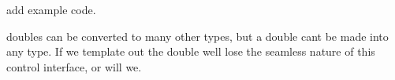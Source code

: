 
\begin{DoxyRefList}
\item[\label{todo__todo000002}%
\Hypertarget{todo__todo000002}%
Member \hyperlink{classCRTSController_aa2b26a62c62fe5758ab5cc9104e96b56}{C\+R\+T\+S\+Controller\+:\+:get\+Control} (const std\+::string name=\char`\"{}\char`\"{}, bool add\+Controller=true, bool start=false)]add example code. 
\item[\label{todo__todo000001}%
\Hypertarget{todo__todo000001}%
Member \hyperlink{classCRTSFilter_acc17d29240468c94e360e1b788f5d6a0}{C\+R\+T\+S\+Filter\+:\+:add\+Parameter} (std\+::string name, std\+::function$<$ double(void)$>$ get, std\+::function$<$ bool(const double \&)$>$ set=0, bool over\+Write=false)]doubles can be converted to many other types, but a double can\textquotesingle{}t be made into any type. If we template out the double we\textquotesingle{}ll lose the seamless nature of this control interface, or will we.
\end{DoxyRefList}